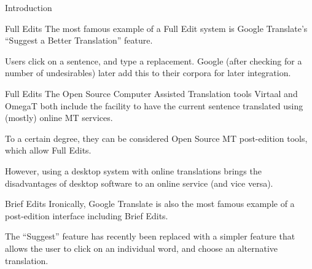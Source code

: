 \documentclass{beamer}
\begin{document}
\begin{section}{Introduction}
\begin{frame}{Full Edits}
The most famous example of a Full Edit system is Google Translate's
``Suggest a Better Translation'' feature.

Users click on a sentence, and type a replacement. Google (after checking
for a number of undesirables) later add this to their corpora for later
integration.
\end{frame}

\begin{frame}{Full Edits}
The Open Source Computer Assisted Translation tools Virtaal and OmegaT
both include the facility to have the current sentence translated
using (mostly) online MT services.

To a certain degree, they can be considered Open Source MT post-edition
tools, which allow Full Edits.

However, using a desktop system with online translations brings the 
disadvantages of desktop software to an online service (and vice versa).
\end{frame}

\begin{frame}{Brief Edits}
Ironically, Google Translate is also the most famous example of a
post-edition interface including Brief Edits.

The ``Suggest'' feature has recently been replaced with a simpler
feature that allows the user to click on an individual word, and
choose an alternative translation.
\end{frame}
\end{section}
\end{document}
